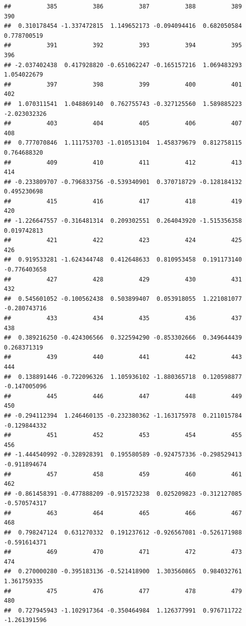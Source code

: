 \documentclass[
]{article}
\begin{document}
\begin{verbatim}
##          385          386          387          388          389          390 
##  0.310178454 -1.337472815  1.149652173 -0.094094416  0.682050584  0.778700519 
##          391          392          393          394          395          396 
## -2.037402438  0.417928820 -0.651062247 -0.165157216  1.069483293  1.054022679 
##          397          398          399          400          401          402 
##  1.070311541  1.048869140  0.762755743 -0.327125560  1.589885223 -2.023032326 
##          403          404          405          406          407          408 
##  0.777070846  1.111753703 -1.010513104  1.458379679  0.812758115  0.764688320 
##          409          410          411          412          413          414 
## -0.233809707 -0.796833756 -0.539340901  0.370718729 -0.128184132  0.495230698 
##          415          416          417          418          419          420 
## -1.226647557 -0.316481314  0.209302551  0.264043920 -1.515356358  0.019742813 
##          421          422          423          424          425          426 
##  0.919533281 -1.624344748  0.412648633  0.810953458  0.191173140 -0.776403658 
##          427          428          429          430          431          432 
##  0.545601052 -0.100562438  0.503899407  0.053918055  1.221081077 -0.280743716 
##          433          434          435          436          437          438 
##  0.389216250 -0.424306566  0.322594290 -0.853302666  0.349644439  0.268371319 
##          439          440          441          442          443          444 
##  0.138891446 -0.722096326  1.105936102 -1.880365718  0.120598877 -0.147005096 
##          445          446          447          448          449          450 
## -0.294112394  1.246460135 -0.232380362 -1.163175978  0.211015784 -0.129844332 
##          451          452          453          454          455          456 
## -1.444540992 -0.328928391  0.195580589 -0.924757336 -0.298529413 -0.911894674 
##          457          458          459          460          461          462 
## -0.861458391 -0.477888209 -0.915723238  0.025209823 -0.312127085 -0.570574317 
##          463          464          465          466          467          468 
##  0.798247124  0.631270332  0.191237612 -0.926567081 -0.526171988 -0.591614371 
##          469          470          471          472          473          474 
##  0.270000280 -0.395183136 -0.521418900  1.303560865  0.984032761  1.361759335 
##          475          476          477          478          479          480 
##  0.727945943 -1.102917364 -0.350464984  1.126377991  0.976711722 -1.261391596 

\end{verbatim}
\end{document}
